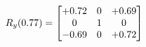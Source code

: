 \documentclass[preview]{standalone}
\begin{document}
\begin{align*}
\special{dvisvgm:raw <g id='unique000'>}R_{y}(0.77) = \begin{bmatrix}+0.72 & 0 & +0.69 \\0 & 1 & 0 \\-0.69 & 0 & +0.72\end{bmatrix}\special{dvisvgm:raw </g>}
\end{align*}
\end{document}
